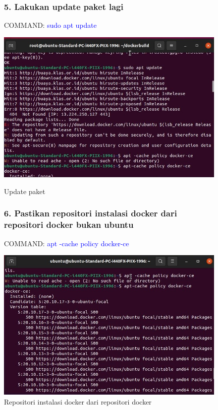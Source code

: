 \begin{figure}
\subsubsection{5. Lakukan update paket lagi}
COMMAND: \textcolor{Blue}{sudo apt update}
        \begin{center}
          \includegraphics[width=\linewidth]{image/16.jpg}
          \caption{Update paket}
          \label{fig:my_figure}
        \end{center}
\subsubsection{6. Pastikan repositori instalasi docker dari repositori docker bukan ubuntu}
COMMAND: \textcolor{Blue}{apt -cache policy docker-ce}
        \begin{center}
          \includegraphics[width=\linewidth]{image/5.jpg}
          \caption{ Repositori instalasi docker dari repositori docker}
          \label{fig:my_figure}
        \end{center}
\end{figure}

